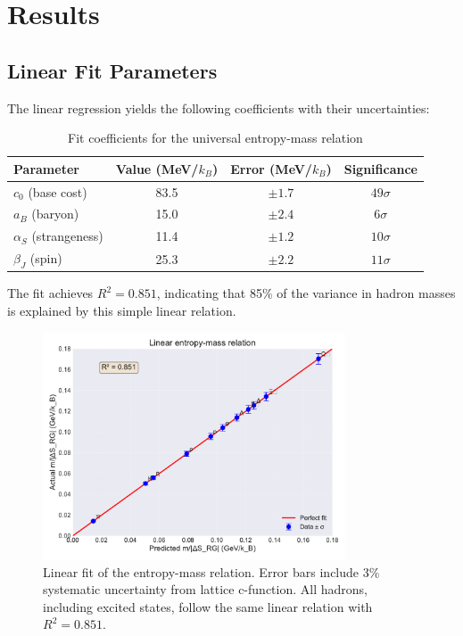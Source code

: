 \documentclass[12pt,a4paper]{article}
\begin{document}
\section{Results}

\subsection{Linear Fit Parameters}

The linear regression yields the following coefficients with their uncertainties:

\begin{table}[H]
\centering
\caption{Fit coefficients for the universal entropy-mass relation}
\label{tab:coefficients}
\begin{tabular}{lccc}
\toprule
Parameter & Value (MeV/$k_B$) & Error (MeV/$k_B$) & Significance \\
\midrule
$c_0$ (base cost) & 83.5 & $\pm 1.7$ & $49\sigma$ \\
$a_B$ (baryon) & 15.0 & $\pm 2.4$ & $6\sigma$ \\
$\alpha_S$ (strangeness) & 11.4 & $\pm 1.2$ & $10\sigma$ \\
$\beta_J$ (spin) & 25.3 & $\pm 2.2$ & $11\sigma$ \\
\bottomrule
\end{tabular}
\end{table}

The fit achieves $R^2 = 0.851$, indicating that 85\% of the variance in hadron masses is explained by this simple linear relation.

\begin{figure}[H]
\centering
\includegraphics[width=0.8\textwidth]{linear_fit.pdf}
\caption{Linear fit of the entropy-mass relation. Error bars include 3\% systematic uncertainty from lattice c-function. All hadrons, including excited states, follow the same linear relation with $R^2 = 0.851$.}
\label{fig:linearfit}
\end{figure}
\end{document}
